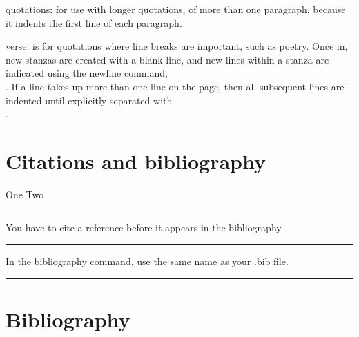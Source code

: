 \documentclass[12pt]{article}
\newcommand{\inOut}[1]{#1}                                %
\begin{document}
    quotations:
        for use with longer quotations, of more than one paragraph, because it indents the first line of each paragraph.

    verse:
        is for quotations where line breaks are important, such as poetry. Once in, new stanzas are created with a blank line, and new lines within a stanza are indicated using the newline command, \\. If a line takes up more than one line on the page, then all subsequent lines are indented until explicitly separated with \\.

\section{Citations and bibliography}\label{secCit}

    \begin{example} \label{expCite1}
    \inOut{One \cite{Aa01} Two \cite{LL01}}
    \end{example}\hrule

    \begin{remark} \label{remCite1}
        You have to cite a reference before it appears in the bibliography
    \end{remark}\hrule

    \begin{remark} \label{remCite2}
        In the bibliography command, use the same name as your .bib file.
    \end{remark}\hrule

    \section{Bibliography}\label{secBib}
    \newpage
    
\end{document}
